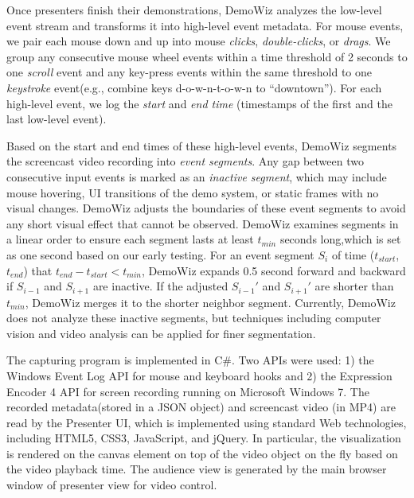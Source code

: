 Once presenters finish their demonstrations, DemoWiz analyzes the low-level event stream and transforms it into high-level event metadata. For mouse events, we pair each mouse down and up into mouse \textit{clicks}, \textit{double-clicks}, or \textit{drags}. We group any consecutive mouse wheel events within a time threshold of 2 seconds to one \textit{scroll} event and any key-press events within the same threshold to one \textit{keystroke} event(e.g., combine keys d-o-w-n-t-o-w-n to ``downtown''). For each high-level event, we log the \textit{start} and \textit{end time} (timestamps of the first and the last low-level event).

Based on the start and end times of these high-level events, DemoWiz segments the screencast video recording into \textit{event segments}. Any gap between two consecutive input events is marked as an \textit{inactive segment}, which may include mouse hovering, UI transitions of the demo system, or static frames with no visual changes. DemoWiz adjusts the boundaries of these event segments to avoid any short visual effect that cannot be observed. DemoWiz examines segments in a linear order to ensure each segment lasts at least $t_{min}$ seconds long,which is set as one second based on our early testing. For an event segment $S_i$ of time ($t_{start}$, $t_{end}$) that $t_{end} - t_{start} < t_{min}$, DemoWiz expands 0.5 second forward and backward if $S_{i-1}$ and $S_{i+1}$ are inactive. If the adjusted $S_{i-1}'$ and $S_{i+1}'$ are shorter than $t_{min}$, DemoWiz merges it to the shorter neighbor segment. Currently, DemoWiz does not analyze these inactive segments, but techniques including computer vision and video analysis \cite{Banovic:2012kd,Chi:2012:MAG:2380116.2380130} can be applied for finer segmentation.

The capturing program is implemented in C\#. Two APIs were used: 1) the Windows Event Log API for mouse and keyboard hooks and 2) the Expression Encoder 4 API for screen recording running on Microsoft Windows 7. The recorded metadata(stored in a JSON object) and screencast video (in MP4) are read by the Presenter UI, which is implemented using standard Web technologies, including HTML5, CSS3, JavaScript, and jQuery. In particular, the visualization is rendered on the canvas element on top of the video object on the fly based on the video playback time. The audience view is generated by the main browser window of presenter view for video control.
